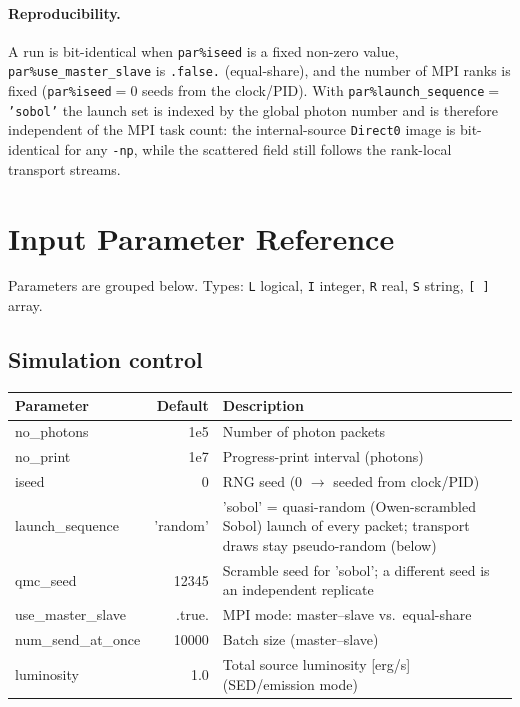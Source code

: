 \documentclass[english,a4paper]{kiseon_memo}
\newcommand{\pp}[1]{\texttt{par\%#1}}
\newcommand{\code}[1]{\texttt{#1}}
\begin{document}
\paragraph{Reproducibility.}  A run is bit-identical when \pp{iseed} is a fixed
non-zero value, \pp{use\_master\_slave} is \code{.false.} (equal-share), and
the number of MPI ranks is fixed (\pp{iseed}${}=0$ seeds from the clock/PID).
With \pp{launch\_sequence}${}=$\code{'sobol'} the launch set is indexed by the
global photon number and is therefore independent of the MPI task count: the
internal-source \code{Direct0} image is bit-identical for any \code{-np},
while the scattered field still follows the rank-local transport streams.

\section{Input Parameter Reference}
Parameters are grouped below.  Types: \code{L} logical, \code{I} integer,
\code{R} real, \code{S} string, \code{[\,]} array.

\subsection{Simulation control}
\begin{longtable}{P D X}
\toprule
\textrm{Parameter} & \textrm{Default} & \textrm{Description}\\
\midrule \endhead
no\_photons        & 1e5   & Number of photon packets\\
no\_print          & 1e7   & Progress-print interval (photons)\\
iseed              & 0     & RNG seed (0 $\to$ seeded from clock/PID)\\
launch\_sequence   & 'random' & 'sobol' = quasi-random (Owen-scrambled Sobol) launch of every packet; transport draws stay pseudo-random (below)\\
qmc\_seed          & 12345 & Scramble seed for 'sobol'; a different seed is an independent replicate\\
use\_master\_slave & .true.& MPI mode: master--slave vs.\ equal-share\\
num\_send\_at\_once& 10000 & Batch size (master--slave)\\
luminosity         & 1.0   & Total source luminosity [erg/s] (SED/emission mode)\\
\bottomrule
\end{longtable}
\end{document}
